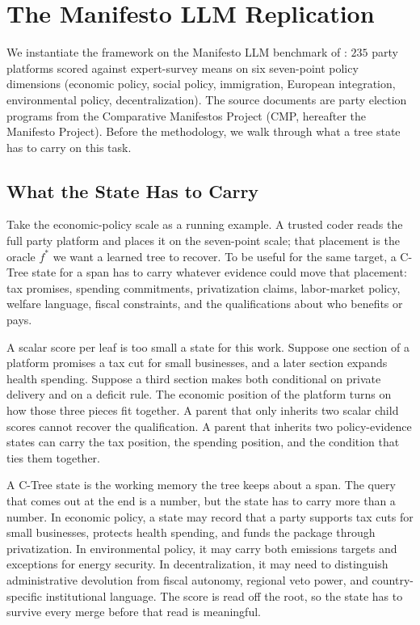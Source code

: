 \section{The Manifesto LLM Replication}
\label{sec:v8-manifesto-results}

We instantiate the framework on the Manifesto LLM benchmark of
\citet{BenoitEtAl2025}: \(235\) party platforms scored against
expert-survey means on six seven-point policy dimensions (economic
policy, social policy, immigration, European integration,
environmental policy, decentralization). The source documents are
party election programs from the Comparative Manifestos Project
(CMP, hereafter the Manifesto Project). Before the methodology, we
walk through what a tree state has to carry on this task.

\subsection{What the State Has to Carry}
\label{sec:v8-manifesto-mechanism}

Take the economic-policy scale as a running example. A trusted
coder reads the full party platform and places it on the
seven-point scale; that placement is the oracle \(f^\ast\) we want
a learned tree to recover. To be useful for the same target, a
C-Tree state for a span has to carry whatever evidence could move
that placement: tax promises, spending commitments, privatization
claims, labor-market policy, welfare language, fiscal constraints,
and the qualifications about who benefits or pays.

A scalar score per leaf is too small a state for this work. Suppose
one section of a platform promises a tax cut for small businesses,
and a later section expands health spending. Suppose a third
section makes both conditional on private delivery and on a deficit
rule. The economic position of the platform turns on how those
three pieces fit together. A parent that only inherits two scalar
child scores cannot recover the qualification. A parent that
inherits two policy-evidence states can carry the tax position, the
spending position, and the condition that ties them together.

A C-Tree state is the working memory the tree keeps about a span.
The query that comes out at the end is a number, but the state has
to carry more than a number. In economic policy, a state may record
that a party supports tax cuts for small businesses, protects health
spending, and funds the package through privatization. In
environmental policy, it may carry both emissions targets and
exceptions for energy security. In decentralization, it may need to
distinguish administrative devolution from fiscal autonomy, regional
veto power, and country-specific institutional language. The score
is read off the root, so the state has to survive every merge before
that read is meaningful.

